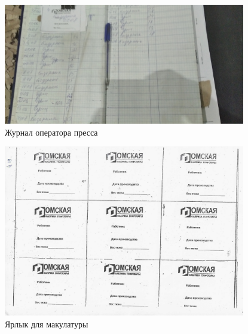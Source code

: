 \begin{figure}
\begin{center}
  \includegraphics[height=0.94\textheight, width=0.94\textwidth, keepaspectratio]{Pics 1/0 журнал на прессе.jpg}
\end{center}
  \caption{Журнал оператора пресса}
  \label{pic:0 журнал на прессе}
\end{figure}

\begin{figure}
\begin{center}
  \includegraphics[height=0.94\textheight, width=0.94\textwidth, angle=180, keepaspectratio]{Pics 1/4.19 этикетка для макулатуры_0001.jpg}
\end{center}
  \caption{Ярлык для макулатуры}
  \label{pic:4.19 этикетка для макулатуры_0001}
\end{figure}

